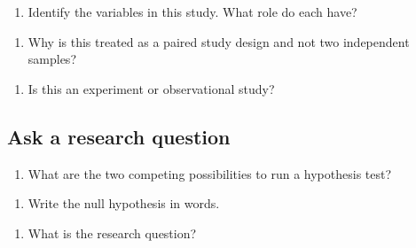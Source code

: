 \documentclass[
]{report}
\providecommand{\tightlist}{%
  \setlength{\itemsep}{0pt}\setlength{\parskip}{0pt}}
\begin{document}
\begin{enumerate}
\def\labelenumi{\arabic{enumi}.}
\setcounter{enumi}{1}
\tightlist
\item
  Identify the variables in this study. What role do each have?
\end{enumerate}

\vspace{.8in}

\begin{enumerate}
\def\labelenumi{\arabic{enumi}.}
\setcounter{enumi}{2}
\tightlist
\item
  Why is this treated as a paired study design and not two independent samples?
\end{enumerate}

\vspace{1in}

\begin{enumerate}
\def\labelenumi{\arabic{enumi}.}
\setcounter{enumi}{3}
\tightlist
\item
  Is this an experiment or observational study?
\end{enumerate}

\vspace{0.3in}

\hypertarget{ask-a-research-question}{%
\subsection{Ask a research question}\label{ask-a-research-question}}

\begin{enumerate}
\def\labelenumi{\arabic{enumi}.}
\setcounter{enumi}{4}
\tightlist
\item
  What are the two competing possibilities to run a hypothesis test?
\end{enumerate}

\vspace{1in}

\begin{enumerate}
\def\labelenumi{\arabic{enumi}.}
\setcounter{enumi}{5}
\tightlist
\item
  Write the null hypothesis in words.
\end{enumerate}

\vspace{1in}

\begin{enumerate}
\def\labelenumi{\arabic{enumi}.}
\setcounter{enumi}{6}
\tightlist
\item
  What is the research question?
\end{enumerate}
\end{document}
